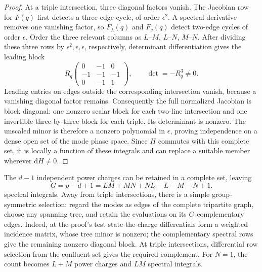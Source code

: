 \begin{proof}
At a triple intersection, three diagonal factors vanish. The Jacobian
row for $F(q)$ first detects a three-edge cycle, of order $\epsilon^2$.
A spectral derivative removes one vanishing factor, so
$F_\lambda(q)$ and $F_\nu(q)$ detect two-edge cycles of order
$\epsilon$. Order the three relevant columns as $L$--$M$,
$L$--$N$, $M$--$N$. After dividing these three rows by
$\epsilon^2,\epsilon,\epsilon$, respectively, determinant
differentiation gives the leading block
\begin{equation}\label{eq:canonical-confluent-block}
 R_q\begin{pmatrix}0&-1&0\\-1&-1&-1\\0&-1&1\end{pmatrix},
 \qquad \det=-R_q^3\ne0.
\end{equation}
Leading entries on edges outside the corresponding intersection
vanish, because a vanishing diagonal factor remains. Consequently
the full normalized Jacobian is block diagonal: one nonzero scalar
block for each two-line intersection and one invertible three-by-three
block for each triple. Its determinant is nonzero. The unscaled
minor is therefore a nonzero polynomial in $\epsilon$, proving
independence on a dense open set of the mode phase space. Since $H$
commutes with this complete set, it is locally a function of these
integrals and can replace a suitable member wherever $\mathrm dH\ne0$.
\end{proof}

The $d-1$ independent power charges can be retained in a complete set,
leaving
\[
 G=p-d+1=LM+MN+NL-L-M-N+1.
\]
spectral integrals. Away from triple intersections, there is a simple
group-symmetric selection: regard the modes as edges of the complete
tripartite graph, choose any spanning tree, and retain the evaluations
on its $G$ complementary edges. Indeed, at the proof's test state the
charge differentials form a weighted incidence matrix, whose tree
minor is nonzero; the complementary spectral rows give the remaining
nonzero diagonal block. At triple intersections, differential row
selection from the confluent set gives the required complement.
For $N=1$, the count becomes $L+M$ power charges and $LM$ spectral
integrals.

